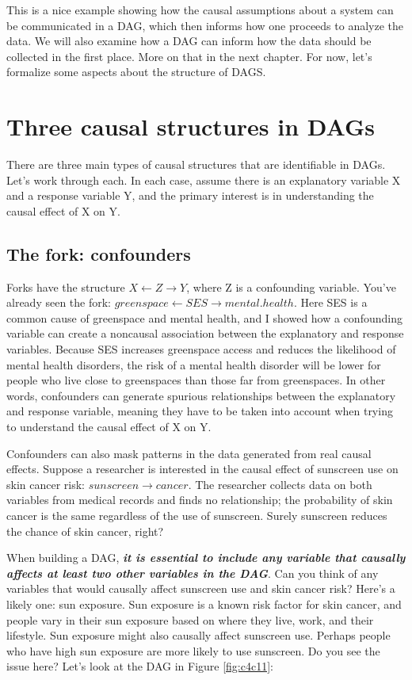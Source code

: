 \documentclass[
]{book}
\begin{document}
This is a nice example showing how the causal assumptions about a system can be communicated in a DAG, which then informs how one proceeds to analyze the data. We will also examine how a DAG can inform how the data should be collected in the first place. More on that in the next chapter. For now, let's formalize some aspects about the structure of DAGS.

\section{Three causal structures in DAGs}\label{three-causal-structures-in-dags}

There are three main types of causal structures that are identifiable in DAGs. Let's work through each. In each case, assume there is an explanatory variable X and a response variable Y, and the primary interest is in understanding the causal effect of X on Y.

\subsection{The fork: confounders}\label{the-fork-confounders}

Forks have the structure \(X \gets Z \to Y\), where Z is a confounding variable. You've already seen the fork: \(greenspace \gets SES \to mental.health\). Here SES is a common cause of greenspace and mental health, and I showed how a confounding variable can create a noncausal association between the explanatory and response variables. Because SES increases greenspace access and reduces the likelihood of mental health disorders, the risk of a mental health disorder will be lower for people who live close to greenspaces than those far from greenspaces. In other words, confounders can generate spurious relationships between the explanatory and response variable, meaning they have to be taken into account when trying to understand the causal effect of X on Y.

Confounders can also mask patterns in the data generated from real causal effects. Suppose a researcher is interested in the causal effect of sunscreen use on skin cancer risk: \(sunscreen \to cancer\). The researcher collects data on both variables from medical records and finds no relationship; the probability of skin cancer is the same regardless of the use of sunscreen. Surely sunscreen reduces the chance of skin cancer, right?

When building a DAG, \textbf{\emph{it is essential to include any variable that causally affects at least two other variables in the DAG}}. Can you think of any variables that would causally affect sunscreen use and skin cancer risk? Here's a likely one: sun exposure. Sun exposure is a known risk factor for skin cancer, and people vary in their sun exposure based on where they live, work, and their lifestyle. Sun exposure might also causally affect sunscreen use. Perhaps people who have high sun exposure are more likely to use sunscreen. Do you see the issue here? Let's look at the DAG in Figure \ref{fig:c4c11}:
\end{document}
